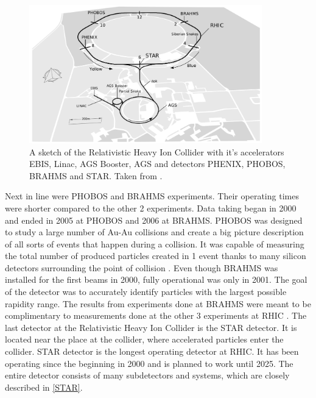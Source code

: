 \FloatBarrier
\begin{figure}[ht]
    \centering
    \includegraphics[width=0.9\textwidth]{figures/rhic.jpg}
    \caption[The Relativistic Heavy Ion Collider]{A sketch of the Relativistic Heavy Ion Collider with it's accelerators EBIS, Linac, AGS Booster, AGS and detectors PHENIX, PHOBOS, BRAHMS and STAR. Taken from \cite{STARgraphicsrep}. }
    \label{df1}
\end{figure}
\FloatBarrier

Next in line were PHOBOS and BRAHMS experiments. Their operating times were shorter compared to the other 2 experiments. Data taking began in 2000 and ended in 2005 at PHOBOS and 2006 at BRAHMS. PHOBOS was designed to study a large number of Au-Au collisions and create a big picture description of all sorts of events that happen during a collision. It was capable of measuring the total number of produced particles created in 1 event thanks to many silicon detectors surrounding the point of collision \cite{PHOBOS}. Even though BRAHMS was installed for the first beams in 2000, fully operational was only in 2001. The goal of the detector was to accurately identify particles with the largest possible rapidity range. The results from experiments done at BRAHMS were meant to be complimentary to measurements done at the other 3 experiments at RHIC \cite{BRAHMSadamczyk}. 
\newline
The last detector at the Relativistic Heavy Ion Collider is the STAR detector. It is located near the place at the collider, where accelerated particles enter the collider. STAR detector is the longest operating detector at RHIC. It has been operating since the beginning in 2000 and is planned to work until 2025. The entire detector consists of many subdetectors and systems, which are closely described in \autoref{STAR}. 

